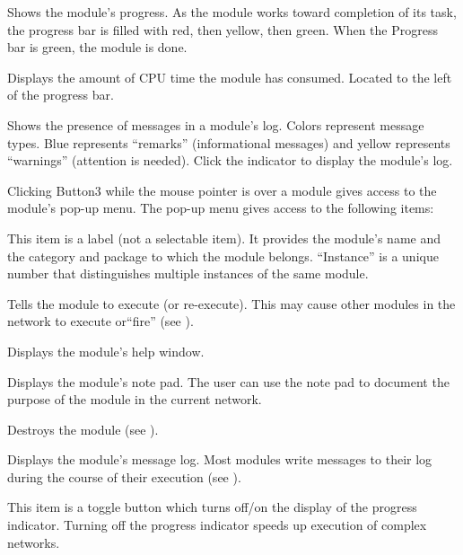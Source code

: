 \begin{description}
   Shows the module's progress.  As the module
  works toward completion of its task, the progress bar is filled
  with red, then yellow, then green.  When the Progress bar
  is green, the module is done.
  
   Displays the amount of CPU time the module has
  consumed.  Located to the left of the progress bar.
  
   Shows the presence of messages in a
  module's log.  Colors represent message types.  Blue represents
  ``remarks'' (informational messages) and yellow represents ``warnings''
  (attention is needed).  Click the indicator to display the
  module's log.

 Clicking Button3 while the mouse
  pointer is over a module gives access to the module's pop-up menu.  The
  pop-up menu gives access to the following items:
  \begin{description}
     This item is a
    label (not a selectable item).  It provides the module's name and
    the category and package to which the module belongs. 
    ``Instance'' is a unique number that distinguishes multiple
    instances of the same module.

     Tells the module to
    execute (or re-execute).  This may cause other modules in the
    network to execute or``fire''
    (see ).

     Displays the module's help window.
    
     Displays the module's note pad.
    The user can use the note pad to document the purpose of the module in
    the current network.

     Destroys the module (see ).
    
     Displays the module's message log.  Most
    modules write messages to their log during the course of
    their execution (see ).
    
     This item is a toggle button which
    turns off/on the display of the progress indicator.  Turning off
    the progress indicator speeds up execution of complex
    networks.
  \end{description}
\end{description}

